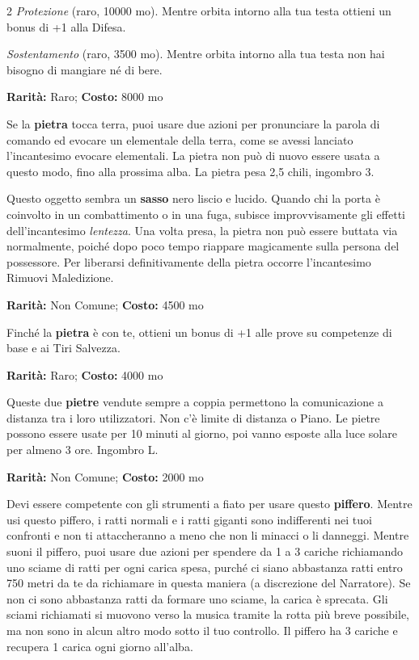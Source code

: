 \begin{multicols}{2}
\emph{Protezione} (raro, 10000 mo). Mentre orbita intorno alla tua testa ottieni un bonus di +1 alla Difesa.

\emph{Sostentamento} (raro, 3500 mo). Mentre orbita intorno alla tua testa non hai bisogno di mangiare né di bere.


\textbf{Rarità:} Raro; \textbf{Costo:} 8000 mo

Se la \textbf{pietra} tocca terra, puoi usare due azioni per pronunciare la parola di comando ed evocare un elementale della terra, come se avessi lanciato l'incantesimo evocare elementali. La pietra non può di nuovo essere usata a questo modo, fino alla prossima alba. La pietra pesa 2,5 chili, ingombro 3.


Questo oggetto sembra un \textbf{sasso} nero liscio e lucido. Quando chi la porta è coinvolto in un combattimento o in una fuga, subisce improvvisamente gli effetti dell'incantesimo \emph{lentezza}. Una volta presa, la pietra non può essere buttata via normalmente, poiché dopo poco tempo riappare magicamente sulla persona del possessore. Per liberarsi definitivamente della pietra occorre l'incantesimo Rimuovi Maledizione.


\textbf{Rarità:} Non Comune; \textbf{Costo:} 4500 mo

Finché la \textbf{pietra} è con te, ottieni un bonus di +1 alle prove su competenze di base e ai Tiri Salvezza.


\textbf{Rarità:} Raro; \textbf{Costo:} 4000 mo

Queste due \textbf{pietre} vendute sempre a coppia permettono la comunicazione a distanza tra i loro utilizzatori. Non c'è limite di distanza o Piano. Le pietre possono essere usate per 10 minuti al giorno, poi vanno esposte alla luce solare per almeno 3 ore. Ingombro L.


\textbf{Rarità:} Non Comune; \textbf{Costo:} 2000 mo

Devi essere competente con gli strumenti a fiato per usare questo \textbf{piffero}. Mentre usi questo piffero, i ratti normali e i ratti giganti sono indifferenti nei tuoi confronti e non ti attaccheranno a meno che non li minacci o li danneggi. Mentre suoni il piffero, puoi usare due azioni per spendere da 1 a 3 cariche richiamando uno sciame di ratti per ogni carica spesa, purché ci siano abbastanza ratti entro 750 metri da te da richiamare in questa maniera (a discrezione del Narratore). Se non ci sono abbastanza ratti da formare uno sciame, la carica è sprecata. Gli sciami richiamati si muovono verso la musica tramite la rotta più breve possibile, ma non sono in alcun altro modo sotto il tuo controllo. Il piffero ha 3 cariche e recupera 1 carica ogni giorno all'alba.


\end{multicols}
